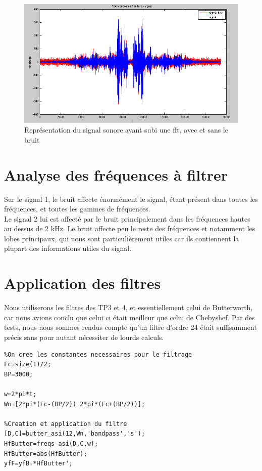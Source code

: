 \documentclass[a4paper, oneside]{report}
\begin{document}
 \begin{figure}[h]
 \centering
 \includegraphics[scale=0.5]{images/signal_bruit_fft.png}
 \caption{Repr\'esentation du signal sonore ayant subi une fft, avec et sans le bruit}
 \end{figure}
  
  \newpage{}
  
 \section{Analyse des fr\'equences \`a filtrer}
 
 Sur le signal 1, le bruit affecte \'enorm\'ement le signal, \'etant pr\'esent dans toutes les fr\'equences, et toutes les gammes de fr\'equences.\\
 
 Le signal 2 lui est affect\'e par le bruit principalement dans les fr\'equences hautes au dessus de 2 kHz. Le bruit affecte peu le reste des fr\'equences et notamment les lobes principaux, qui nous sont particuli\`erement utiles car ils contiennent la plupart des informations utiles du signal.

 \section{Application des filtres}
 
Nous utiliserons les filtres des TP3 et 4, et essentiellement celui de Butterworth, car nous avions conclu que celui ci \'etait meilleur que celui de Chebyshef. Par des tests, nous nous sommes rendus compte qu'un filtre d'ordre 24 \'etait suffisamment pr\'ecis sans pour autant n\'ecessiter de lourds calculs.

\begin{lstlisting}
%On cree les constantes necessaires pour le filtrage
Fc=size(1)/2;
BP=3000;

w=2*pi*t;
Wn=[2*pi*(Fc-(BP/2)) 2*pi*(Fc+(BP/2))];

%Creation et application du filtre
[D,C]=butter_asi(12,Wn,'bandpass','s');
HfButter=freqs_asi(D,C,w);
HfButter=abs(HfButter);
yfF=yfB.*HfButter';
\end{lstlisting}
\end{document}
